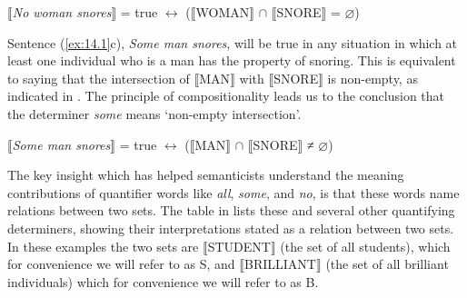 \ea \label{ex:14.3}
{}$\llbracket$\textit{No woman snores}$\rrbracket$  = true $\leftrightarrow $ ($\llbracket$WOMAN$\rrbracket$  ${\cap}$ $\llbracket$SNORE$\rrbracket$  = ⌀)
\z


Sentence (\ref{ex:14.1}c), \textit{Some man snores}, will be true in any situation in which at least one individual who is a man has the property of snoring. This is equivalent to saying that the intersection of $\llbracket$MAN$\rrbracket$  with $\llbracket$SNORE$\rrbracket$  is non-empty, as indicated in . The principle of compositionality leads us to the conclusion that the determiner \textit{some} means ‘non-empty intersection’.


\ea \label{ex:14.4}
{}$\llbracket$\textit{Some man snores}$\rrbracket$  = true $\leftrightarrow $ ($\llbracket$MAN$\rrbracket$  ${\cap}$ $\llbracket$SNORE$\rrbracket$  ≠ ⌀)
\z


The key insight which has helped semanticists understand the meaning contributions of quantifier words like \textit{all}, \textit{some}, and \textit{no}, is that these words name relations between two sets. The table in  lists these and several other quantifying determiners, showing their interpretations stated as a relation between two sets. In these examples the two sets are \textsc{$\llbracket$}STUDENT$\rrbracket$  (the set of all students), which for convenience we will refer to as S, and \textsc{$\llbracket$}BRILLIANT$\rrbracket$  (the set of all brilliant individuals) which for convenience we will refer to as B.

